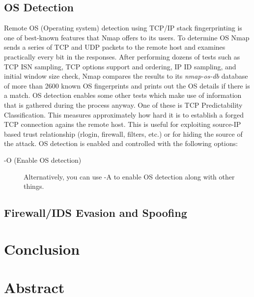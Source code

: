 \documentclass[times, utf8, seminar,english]{fer}
\begin{document}
\section{OS Detection}
Remote OS (Operating system) detection using TCP/IP stack fingerprinting is one of best-known features that Nmap offers to its users. To determine OS Nmap sends a series of TCP and UDP packets to the remote host and examines practically every bit in the responses. After performing dozens of tests such as TCP ISN sampling, TCP options support and ordering, IP ID sampling, and initial window size check, Nmap compares the results to its \textit{nmap-os-db} database of more than 2600 known OS fingerprints and prints out the OS details if there is a match. OS detection enables some other tests which make use of information that is gathered during the process anyway. One of these is TCP Predictability Classification. This measures approximately how hard it is to establish a forged TCP connection agains the remote host. This is useful for exploiting source-IP based trust relationship (rlogin, firewall, filters, etc.) or for hiding the source of the attack. OS detection is enabled and controlled with the following options:
\begin{description}
	\item [-O (Enable OS detection)] Alternatively, you can use -A to enable OS detection along with other things.
\end{description}
\pagebreak
\section{Firewall/IDS Evasion and Spoofing}

\chapter{Conclusion}




\chapter{Abstract}
\end{document}
